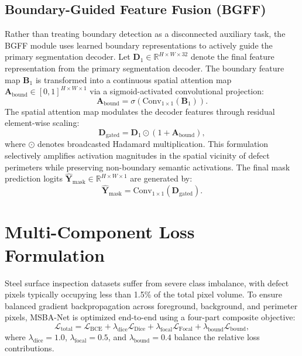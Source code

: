 \documentclass{ieeeaccess}
\begin{document}
\subsection{Boundary-Guided Feature Fusion (BGFF)}
\label{sec:bgff_module}
Rather than treating boundary detection as a disconnected auxiliary task, the BGFF module uses learned boundary representations to actively guide the primary segmentation decoder. Let $\mathbf{D}_1 \in \mathbb{R}^{H \times W \times 32}$ denote the final feature representation from the primary segmentation decoder. The boundary feature map $\mathbf{B}_1$ is transformed into a continuous spatial attention map $\mathbf{A}_{\text{bound}} \in [0, 1]^{H \times W \times 1}$ via a sigmoid-activated convolutional projection:
\begin{equation}
  \mathbf{A}_{\text{bound}} = \sigma\left(\text{Conv}_{1 \times 1}(\mathbf{B}_1)\right).
\end{equation}
The spatial attention map modulates the decoder features through residual element-wise scaling:
\begin{equation}
  \mathbf{D}_{\text{gated}} = \mathbf{D}_1 \odot \left(1 + \mathbf{A}_{\text{bound}}\right),
\end{equation}
where $\odot$ denotes broadcasted Hadamard multiplication. This formulation selectively amplifies activation magnitudes in the spatial vicinity of defect perimeters while preserving non-boundary semantic activations. The final mask prediction logits $\hat{\mathbf{Y}}_{\text{mask}} \in \mathbb{R}^{H \times W \times 1}$ are generated by:
\begin{equation}
  \hat{\mathbf{Y}}_{\text{mask}} = \text{Conv}_{1 \times 1}(\mathbf{D}_{\text{gated}}).
\end{equation}

\section{Multi-Component Loss Formulation}
\label{sec:loss_formulation}
Steel surface inspection datasets suffer from severe class imbalance, with defect pixels typically occupying less than 1.5\% of the total pixel volume. To ensure balanced gradient backpropagation across foreground, background, and perimeter pixels, MSBA-Net is optimized end-to-end using a four-part composite objective:
\begin{equation}
  \mathcal{L}_{\text{total}} = \mathcal{L}_{\text{BCE}} + \lambda_{\text{dice}}\mathcal{L}_{\text{Dice}} + \lambda_{\text{focal}}\mathcal{L}_{\text{Focal}} + \lambda_{\text{bound}}\mathcal{L}_{\text{bound}},
  \label{eq:total_loss}
\end{equation}
where $\lambda_{\text{dice}} = 1.0$, $\lambda_{\text{focal}} = 0.5$, and $\lambda_{\text{bound}} = 0.4$ balance the relative loss contributions.
\end{document}
